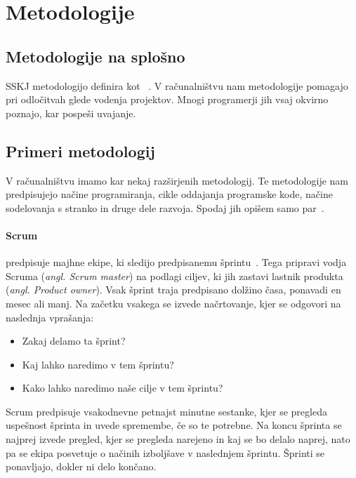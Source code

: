\section{Metodologije}

\subsection{Metodologije na splošno}
SSKJ metodologijo definira kot ~\cite{metodologija_def}.
V računalništvu nam metodologije pomagajo pri odločitvah glede vodenja projektov.
Mnogi programerji jih vsaj okvirno poznajo, kar pospeši uvajanje.

\subsection{Primeri metodologij}
V računalništvu imamo kar nekaj razširjenih metodologij.
Te metodologije nam predpisujejo načine programiranja,
cikle oddajanja programske kode,
načine sodelovanja s stranko in druge dele razvoja.
Spodaj jih opišem samo par~\cite{agile_methodologies}.

\paragraph{Scrum} predpisuje majhne ekipe, ki sledijo predpisanemu šprintu~\cite{scrum_meth}.
Tega pripravi vodja Scruma (\textit{angl. Scrum master})
na podlagi ciljev, ki jih zastavi lastnik produkta (\textit{angl. Product owner}).
Vsak šprint traja predpisano dolžino časa, ponavadi en mesec ali manj.
Na začetku vsakega se izvede načrtovanje, kjer se odgovori na naslednja vprašanja:

\begin{itemize}
    \item Zakaj delamo ta šprint?
    \item Kaj lahko naredimo v tem šprintu?
    \item Kako lahko naredimo naše cilje v tem šprintu?
\end{itemize}

Scrum predpisuje vsakodnevne petnajst minutne sestanke,
kjer se pregleda uspešnost šprinta in uvede spremembe,
če so te potrebne.
Na koncu šprinta se najprej izvede pregled, kjer se pregleda narejeno in 
kaj se bo delalo naprej, 
nato pa se ekipa posvetuje o načinih izboljšave v naslednjem šprintu.
Šprinti se ponavljajo, dokler ni delo končano.

